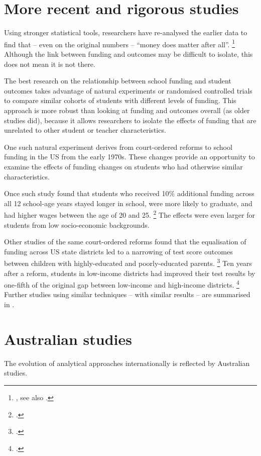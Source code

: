 \documentclass{grattan}
\begin{document}
\section{More recent and rigorous studies}
Using stronger statistical tools, researchers have re-analysed the earlier data to find that -- even on the original numbers -- ``money does matter after all''.%
\footnote{\textcite[][13]{Hedges1994ExchangePartI}, see also \textcites{Krueger2003EconomicConsiderationsClass}{Konstantopoulos2011FamilyBackgroundSchool}.}
Although the link between funding and outcomes may be difficult to isolate, this does not mean it is not there. \CenturyFootnote

The best research on the relationship between school funding and student outcomes takes advantage of natural experiments or randomised controlled trials to compare similar cohorts of students with different levels of funding.
This approach is more robust than looking at funding and outcomes overall (as older studies did), because it allows researchers to isolate the effects of funding that are unrelated to other student or teacher characteristics.

One such natural experiment derives from court-ordered reforms to school funding in the US from the early 1970s.
These changes provide an opportunity to examine the effects of funding changes on students who had otherwise similar characteristics.

Once such study found that students who received 10\% additional funding across all 12 school-age years stayed longer in school, were more likely to graduate, and had higher wages between the age of 20 and 25.%
\footcite{Jackson2016EffectsSchoolSpending} The effects were even larger for students from low socio-economic backgrounds.

Other studies of the same court-ordered reforms found that the equalisation of funding across US state districts led to a narrowing of test score outcomes between children with highly-educated and poorly-educated parents.%
\footcite[][80]{Card2002Schoolfinancereform} Ten years after a reform, students in low-income districts had improved their test results by one-fifth of the original gap between low-income and high-income districts.%
\footcite{Lafortune2016SchoolFinanceReform}
Further studies using similar techniques -- with similar results -- are summarised in
.



\section{Australian studies}\label{sec:australian-studies}
The evolution of analytical approaches internationally is reflected by Australian studies.
\end{document}
